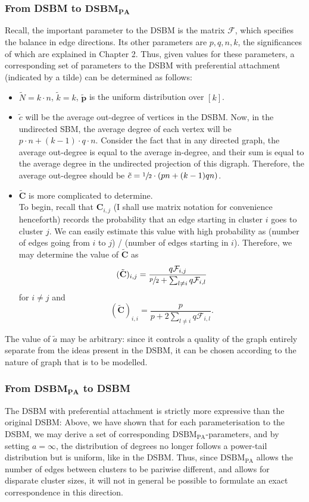 \subsubsection{From DSBM to $\mathbf{DSBM}_\mathbf{PA}$}
Recall, the important parameter to the DSBM is the matrix $\mathcal{F}$, which specifies the 
balance in edge directions. Its other parameters are $p, q, n, k$, the significances of which are 
explained in Chapter 2. Thus, given values for these parameters, a corresponding set of 
parameters to the DSBM with preferential attachment (indicated by a tilde) can be determined as 
follows:
\begin{itemize}
	\item
	$\tilde N = k\cdot n$, $\tilde k = k$, $\tilde{\mathbf{p}}$ is the uniform distribution over 
	$[k]$.
	\item
	$\tilde c$ will be the average out-degree of vertices in the DSBM. Now, in the undirected 
	SBM, the average degree of each vertex will be $p\cdot n + (k-1)\cdot q \cdot n$. Consider
	the fact that in any directed graph, the average out-degree is equal to the average 
	in-degree, and their sum is equal to the average degree in the undirected projection of this
	digraph. Therefore, the average out-degree should be $\tilde c = \sfrac{1}{2} \cdot 
	(pn + (k-1)qn)$.
	\item
	$\tilde{\mathbf{C}}$ is more complicated to determine. \\
	To begin, recall that $\mathbf{C}_{i,j}$ (I shall use matrix notation for convenience 
	henceforth) records the probability that an edge starting in cluster $i$ goes to cluster 
	$j$. We can easily estimate this value with high probability as (number of edges going from
	$i$ to $j$) / (number of edges starting in $i$). Therefore, we may determine the value of 
	$\tilde{\mathbf{C}}$ as 
	$$
		(\tilde{\mathbf{C}})_{i,j} = \frac{q\mathcal{F}_{i,j}}{\sfrac{p}{2} + \sum_{l \neq 
		i} q\mathcal{F}_{i,l}}
	$$
	for $i \neq j$ and 
	$$
		(\tilde{\mathbf{C}})_{i,i} = \frac{p}{p + 2\sum_{l \neq 
		i} q\mathcal{F}_{i,l}}.
	$$
\end{itemize}
The value of $\tilde a$ may be arbitrary: since it controls a quality of the graph entirely 
separate from the ideas present in the DSBM, it can be chosen according to the nature of graph that
is to be modelled.

\subsubsection{From $\mathbf{DSBM}_\mathbf{PA}$ to DSBM}
The DSBM with 
preferential attachment is strictly more expressive than the original DSBM: Above, we have shown 
that for each parameterisation to the DSBM, we may derive a set of corresponding 
$\mathrm{DSBM}_\mathrm{PA}$-parameters, and by setting $a = \infty$, the distribution of degrees 
no longer follows a power-tail distribution but is uniform, like in the DSBM. Thus, since
$\mathrm{DSBM}_\mathrm{PA}$ allows the number of edges between clusters to be pariwise different, 
and allows for disparate cluster sizes, it will not in general be possible to formulate an exact 
correspondence in this direction.  

